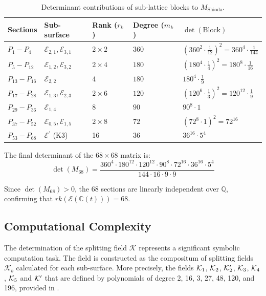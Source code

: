 \documentclass[11pt]{amsart}
\begin{document}
\begin{table}[h!]
	\centering
	\begin{tabular}{@{}lllll@{}}
		\toprule
		Sections & Sub-surface & Rank ($r_k$) & Degree ($m_k$) & $\det(\text{Block})$ \\ \midrule
		$P_1 - P_4$ & $\mathcal{E}_{2,1}, \mathcal{E}_{3,1}$ & $2 \times 2$ & $360$ & $(360^2 \cdot \frac{1}{12})^2 = 360^4 \cdot \frac{1}{144}$ \\
		$P_5 - P_{12}$ & $\mathcal{E}_{1,2}, \mathcal{E}_{3,2}$ & $2 \times 4$ & $180$ & $(180^4 \cdot \frac{1}{4})^2 = 180^8 \cdot \frac{1}{16}$ \\
		$P_{13} - P_{16}$ & $\mathcal{E}_{2,2}$ & 4 & $180$ & $180^4 \cdot \frac{1}{9}$ \\
		$P_{17} - P_{28}$ & $\mathcal{E}_{1,3}, \mathcal{E}_{2,3}$ & $2 \times 6$ & $120$ & $(120^6 \cdot \frac{1}{3})^2 = 120^{12} \cdot \frac{1}{9}$ \\
		$P_{29} - P_{36}$ & $\mathcal{E}_{1,4}$ & 8 & $90$ & $90^8 \cdot 1$ \\
		$P_{37} - P_{52}$ & $\mathcal{E}_{0,5}, \mathcal{E}_{1,5}$ & $2 \times 8$ & $72$ & $(72^8 \cdot 1)^2 = 72^{16}$ \\
		$P_{53} - P_{68}$ & $\mathcal{E}^{\prime}$ (K3) & 16 & $36$ & $36^{16} \cdot 5^4$ \\ \bottomrule
	\end{tabular}
	\caption{Determinant contributions of sub-lattice blocks to $M_{\text{Shioda}}$.}
\end{table}

The final determinant of the $68 \times 68$ matrix is:
\begin{equation}
	\det(M_{68}) = \frac{360^4 \cdot 180^{12} \cdot 120^{12} \cdot 90^8 \cdot 72^{16} \cdot 36^{16} \cdot 5^4}{144 \cdot 16 \cdot 9 \cdot 9}
\end{equation}

Since $\det(M_{68}) > 0$, the 68 sections are linearly independent over $\mathbb{Q}$, confirming that $rk(\mathcal{E}(\mathbb{C}(t))) = 68$.

	\subsection{Computational Complexity}

The determination of the splitting field $\mathcal{K}$ represents a significant symbolic computation task. The field is constructed as the compositum of splitting fields $\mathcal{K}_b$ calculated for each sub-surface. 
More precisely,  the fields ${\mathcal K}_1$,  ${\mathcal K}_2$,  ${\mathcal K}'_2$, ${\mathcal K}_3$, ${\mathcal K}_4$, ${\mathcal K}_5$ and ${\mathcal K}'$ that are defined by polynomials of degree 2, 16, 3, 27, 48, 120, and 196, provided in \cite[Gp-360]{Shioda360-Codes}.
\end{document}
